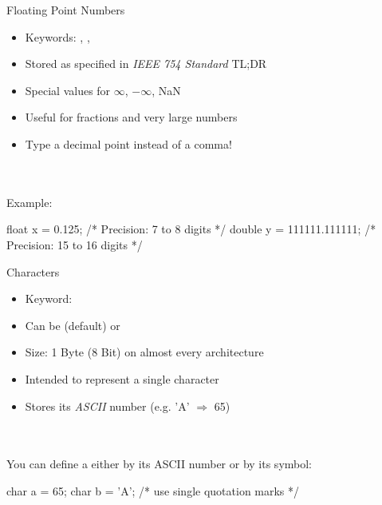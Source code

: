 \documentclass[10pt,graphics,aspectratio=169,table]{beamer}
\begin{document}
\begin{frame}[fragile]{Floating Point Numbers}
    \begin{itemize}
        \item Keywords: , , 
        \item Stored as specified in \textit{IEEE 754 Standard} TL;DR
        \item Special values for $\infty$, $-\infty$, NaN
        \item Useful for fractions and very large numbers
        \item Type a decimal point instead of a comma!
    \end{itemize}\ \\
    \ \\
    Example:
    \begin{codeblock}
float x = 0.125;             /* Precision: 7 to 8 digits */
double y = 111111.111111;    /* Precision: 15 to 16 digits */
    \end{codeblock}

\end{frame}
\begin{frame}[fragile]{Characters}
    \begin{itemize}
        \item Keyword: 
        \item Can be (default) or     
        \item Size: 1 Byte (8 Bit) on almost every architecture
        \item Intended to represent a single character
        \item Stores its \textit{ASCII} number (e.g. 'A' $\Rightarrow$ 65)
    \end{itemize}\ \\
    \ \\
    You can define a  either by its ASCII number or by its symbol:
    \begin{codeblock}
char a = 65;
char b = 'A';    /* use single quotation marks */
    \end{codeblock}
\end{frame}
\end{document}
